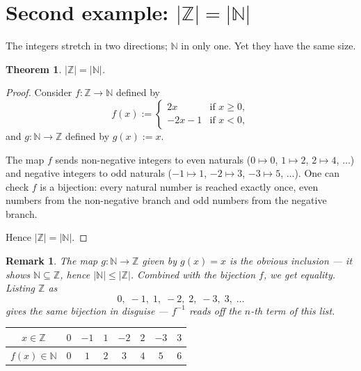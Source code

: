 \documentclass[11pt]{article}
\theoremstyle{defstyle}
\theoremstyle{thmstyle}
\newtheorem{theorem}{Theorem}[section]
\theoremstyle{notstyle}
\newtheorem*{remark}{Remark}
\theoremstyle{cautionstyle}
\newcommand{\Z}{\mathbb{Z}}
\newcommand{\N}{\mathbb{N}}
\begin{document}
\section{Second example: \texorpdfstring{$|\Z| = |\N|$}{|Z|=|N|}}

The integers stretch in two directions; $\N$ in only one. Yet they have the same size.

\begin{thmbox}
\begin{theorem}
$|\Z| = |\N|$.
\end{theorem}
\end{thmbox}

\begin{proof}
Consider $f : \Z \to \N$ defined by
\[
  f(x) := \begin{cases} 2x & \text{if } x \geq 0, \\ -2x - 1 & \text{if } x < 0, \end{cases}
\]
and $g : \N \to \Z$ defined by $g(x) := x$.

The map $f$ sends non-negative integers to even naturals ($0 \mapsto 0$, $1 \mapsto 2$, $2 \mapsto 4$, $\ldots$) and negative integers to odd naturals ($-1 \mapsto 1$, $-2 \mapsto 3$, $-3 \mapsto 5$, $\ldots$). One can check $f$ is a bijection: every natural number is reached exactly once, even numbers from the non-negative branch and odd numbers from the negative branch.

Hence $|\Z| = |\N|$.
\end{proof}

\begin{notebox}
\begin{remark}
The map $g : \N \to \Z$ given by $g(x) = x$ is the obvious inclusion --- it shows $\N \subseteq \Z$, hence $|\N| \leq |\Z|$. Combined with the bijection $f$, we get equality. Listing $\Z$ as
\[
  0, \; -1, \; 1, \; -2, \; 2, \; -3, \; 3, \; \ldots
\]
gives the same bijection in disguise --- $f^{-1}$ reads off the $n$-th term of this list.
\end{remark}
\end{notebox}

\begin{center}
\renewcommand{\arraystretch}{1.5}
\begin{tabular}{|c|c|c|c|c|c|c|c|}
\hline
$x \in \Z$ & $0$ & $-1$ & $1$ & $-2$ & $2$ & $-3$ & $3$ \\
\hline
$f(x) \in \N$ & $0$ & $1$ & $2$ & $3$ & $4$ & $5$ & $6$ \\
\hline
\end{tabular}
\end{center}
\end{document}
